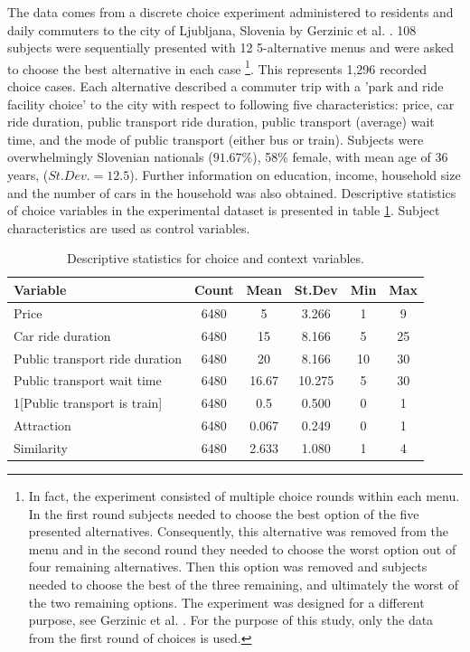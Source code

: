 \documentclass[a4paper,12pt]{article}
\newcommand{\citeyearonly}[1]{\citeyearpar{#1}}
\begin{document}
The data comes from a discrete choice experiment administered to residents and daily commuters to the city of Ljubljana, Slovenia by Gerzinic et al. \citeyearonly{gerzinicEtAl21}. 108 subjects were sequentially presented with 12 5-alternative menus and were asked to choose the best alternative in each case \footnote{In fact, the experiment consisted of multiple choice rounds within each menu. In the first round subjects needed to choose the best option of the five presented alternatives. Consequently, this alternative was removed from the menu and in the second round they needed to choose the worst option out of four remaining alternatives. Then this option was removed and subjects needed to choose the best of the three remaining, and ultimately the worst of the two remaining options. The experiment was designed for a different purpose, see Gerzinic et al. \citeyearonly{gerzinicEtAl21}. For the purpose of this study, only the data from the first round of choices is used.}.  This represents 1,296 recorded choice cases. Each alternative described a commuter trip with a 'park and ride facility choice' to the city with respect to following five characteristics: price, car ride duration, public transport ride duration, public transport (average) wait time, and the mode of public transport (either bus or train). Subjects were overwhelmingly Slovenian nationals ($91.67\%$), 58\% female, with mean age of 36 years, ($St. Dev.=12.5$). Further information on education, income, household size and the number of cars in the household was also obtained. Descriptive  statistics of choice variables in the experimental dataset is presented in table \ref{tab:descriptivesNejc}. Subject characteristics are used as control variables.

\begin{table}[ht]
    \centering
    \begin{tabular}{lccccc}
    \toprule
    Variable & Count & Mean & St.Dev & Min & Max \\
    \midrule
    Price & 6480 & 5 & 3.266 & 1 & 9 \\
    Car ride duration & 6480 & 15 & 8.166 & 5 & 25 \\
    Public transport ride duration & 6480 & 20 & 8.166 & 10 & 30 \\
    Public transport wait time & 6480 & 16.67 & 10.275 & 5 & 30 \\
    1[Public transport is train] & 6480 & 0.5 & 0.500 & 0 & 1 \\
    Attraction & 6480 & 0.067 & 0.249 & 0 & 1 \\
    Similarity & 6480 & 2.633 & 1.080 & 1 & 4 \\
    \bottomrule
    \end{tabular}
    \caption[Descriptive statistics of variables for transport experiment data]{Descriptive statistics for choice and context variables.}
    \label{tab:descriptivesNejc}
\end{table}
\end{document}
